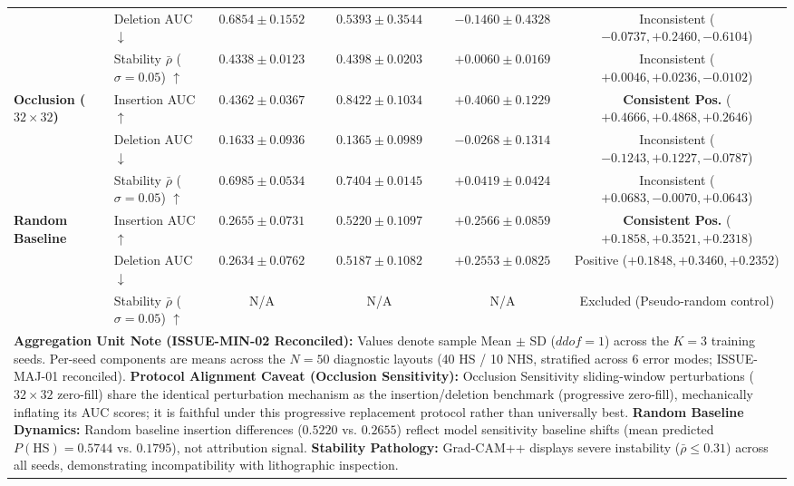 \begin{table}[t]
\begin{tabular}{llcccc}
 & Deletion AUC $\downarrow$ & $0.6854 \pm 0.1552$ & $0.5393 \pm 0.3544$ & $-0.1460 \pm 0.4328$ & Inconsistent ($-0.0737, +0.2460, -0.6104$) \\
 & Stability $\bar{\rho}$ ($\sigma=0.05$) $\uparrow$ & $0.4338 \pm 0.0123$ & $0.4398 \pm 0.0203$ & $+0.0060 \pm 0.0169$ & Inconsistent ($+0.0046, +0.0236, -0.0102$) \\
\hline
\textbf{Occlusion ($32\times32$)} & Insertion AUC $\uparrow$ & $0.4362 \pm 0.0367$ & $\mathbf{0.8422 \pm 0.1034}$ & $+0.4060 \pm 0.1229$ & \textbf{Consistent Pos.} ($+0.4666, +0.4868, +0.2646$) \\
 & Deletion AUC $\downarrow$ & $0.1633 \pm 0.0936$ & $\mathbf{0.1365 \pm 0.0989}$ & $-0.0268 \pm 0.1314$ & Inconsistent ($-0.1243, +0.1227, -0.0787$) \\
 & Stability $\bar{\rho}$ ($\sigma=0.05$) $\uparrow$ & $0.6985 \pm 0.0534$ & $0.7404 \pm 0.0145$ & $+0.0419 \pm 0.0424$ & Inconsistent ($+0.0683, -0.0070, +0.0643$) \\
\hline
\textbf{Random Baseline} & Insertion AUC $\uparrow$ & $0.2655 \pm 0.0731$ & $0.5220 \pm 0.1097$ & $+0.2566 \pm 0.0859$ & \textbf{Consistent Pos.} ($+0.1858, +0.3521, +0.2318$) \\
 & Deletion AUC $\downarrow$ & $0.2634 \pm 0.0762$ & $0.5187 \pm 0.1082$ & $+0.2553 \pm 0.0825$ & Positive ($+0.1848, +0.3460, +0.2352$) \\
 & Stability $\bar{\rho}$ ($\sigma=0.05$) $\uparrow$ & N/A & N/A & N/A & Excluded (Pseudo-random control) \\
\hline
\multicolumn{6}{l}{\parbox{0.96\textwidth}{\vspace{2pt}\footnotesize{\textbf{Aggregation Unit Note (ISSUE-MIN-02 Reconciled):} Values denote sample Mean $\pm$ SD ($ddof=1$) across the $K=3$ training seeds. Per-seed components are means across the $N=50$ diagnostic layouts (40 HS / 10 NHS, stratified across 6 error modes; ISSUE-MAJ-01 reconciled). \textbf{Protocol Alignment Caveat (Occlusion Sensitivity):} Occlusion Sensitivity sliding-window perturbations ($32\times32$ zero-fill) share the identical perturbation mechanism as the insertion/deletion benchmark (progressive zero-fill), mechanically inflating its AUC scores; it is faithful under this progressive replacement protocol rather than universally best. \textbf{Random Baseline Dynamics:} Random baseline insertion differences ($0.5220$ vs. $0.2655$) reflect model sensitivity baseline shifts (mean predicted $P(\text{HS}) = 0.5744$ vs. $0.1795$), not attribution signal. \textbf{Stability Pathology:} Grad-CAM++ displays severe instability ($\bar{\rho} \le 0.31$) across all seeds, demonstrating incompatibility with lithographic inspection.}}} \\
\end{tabular}
\end{table}

